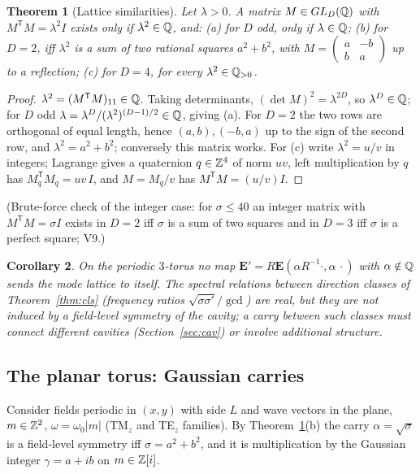 \documentclass[11pt,a4paper]{article}
\newtheorem{theorem}{Theorem}[section]
\newtheorem{corollary}[theorem]{Corollary}
\theoremstyle{definition}
\theoremstyle{remark}
\newcommand{\bE}{\mathbf E}\newcommand{\bB}{\mathbf B}
\begin{document}
\begin{theorem}[Lattice similarities]\label{thm:sim}
Let $\lambda>0$. A matrix $M\in GL_D(\mathbb Q)$ with $M^{\mathsf T}M=\lambda^2I$ exists only if $\lambda^2\in\mathbb Q$, and:
(a) for $D$ odd, only if $\lambda\in\mathbb Q$;
(b) for $D=2$, iff $\lambda^2$ is a sum of two rational squares $a^2+b^2$, with $M=\left(\begin{smallmatrix}a&-b\\b&a\end{smallmatrix}\right)$ up to a reflection;
(c) for $D=4$, for every $\lambda^2\in\mathbb Q_{>0}$.
\end{theorem}
\begin{proof}
$\lambda^2=(M^{\mathsf T}M)_{11}\in\mathbb Q$. Taking determinants, $(\det M)^2=\lambda^{2D}$, so $\lambda^D\in\mathbb Q$; for $D$ odd $\lambda=\lambda^D/(\lambda^2)^{(D-1)/2}\in\mathbb Q$, giving (a). For $D=2$ the two rows are orthogonal of equal length, hence $(a,b),(-b,a)$ up to the sign of the second row, and $\lambda^2=a^2+b^2$; conversely this matrix works. For (c) write $\lambda^2=u/v$ in integers; Lagrange gives a quaternion $q\in\mathbb Z^4$ of norm $uv$, left multiplication by $q$ has $M_q^{\mathsf T}M_q=uv\,I$, and $M=M_q/v$ has $M^{\mathsf T}M=(u/v)I$.
\end{proof}
(Brute-force check of the integer case: for $\sigma\le40$ an integer matrix with $M^{\mathsf T}M=\sigma I$ exists in $D=2$ iff $\sigma$ is a sum of two squares and in $D=3$ iff $\sigma$ is a perfect square; V9.)

\begin{corollary}\label{cor:3d}
On the periodic $3$-torus no map $\bE'=R\bE(\alpha R^{-1}\cdot,\alpha\,\cdot)$ with $\alpha\notin\mathbb Q$ sends the mode lattice to itself. The spectral relations between direction classes of Theorem~\ref{thm:cls} (frequency ratios $\sqrt{\sigma\sigma'}/\gcd$) are real, but they are not induced by a field-level symmetry of the cavity; a carry between such classes must connect different cavities (Section~\ref{sec:cav}) or involve additional structure.
\end{corollary}

\subsection{The planar torus: Gaussian carries}
Consider fields periodic in $(x,y)$ with side $L$ and wave vectors in the plane, $m\in\mathbb Z^2$, $\omega=\omega_0|m|$ (TM$_z$ and TE$_z$ families). By Theorem~\ref{thm:sim}(b) the carry $\alpha=\sqrt\sigma$ is a field-level symmetry iff $\sigma=a^2+b^2$, and it is multiplication by the Gaussian integer $\gamma=a+ib$ on $m\in\mathbb Z[i]$.
\end{document}
